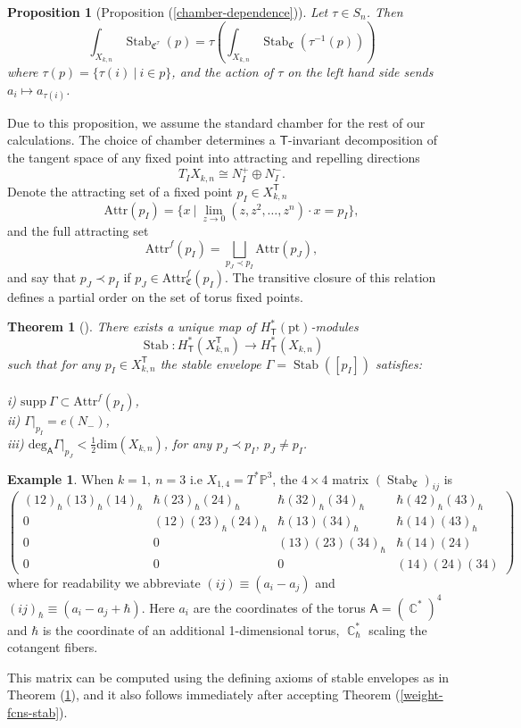 \documentclass[12 pt]{article}
\theoremstyle{plain}
\newtheorem{theorem}{Theorem}[section]
\theoremstyle{plain}
\theoremstyle{plain}
\theoremstyle{plain}
\theoremstyle{plain}
\theoremstyle{plain}
\theoremstyle{plain}
\theoremstyle{plain}
\newtheorem*{proposition*}{Proposition}
\theoremstyle{plain}
\theoremstyle{plain}
\theoremstyle{remark}
\theoremstyle{remark}
\theoremstyle{definition}
\theoremstyle{definition}
\theoremstyle{definition}
\newtheorem{example}{Example}[section]
\theoremstyle{definition}
\theoremstyle{definition}
\theoremstyle{definition}
\DeclareMathOperator{\C}{\mathbb{C}}
\DeclareMathOperator{\Stab}{Stab}
\DeclareMathOperator{\stab}{\text{Stab}}
\newcommand{\bT}{\mathsf{T}}
\newcommand{\bA}{\mathsf{A}}
\newcommand{\chamb}{\mathfrak{C}}
\begin{document}
\begin{proposition*}[Proposition (\ref{chamber-dependence})]
Let $\tau \in S_n$. Then 
\[
\int_{X_{k,n}}\Stab_{\chamb^{\tau}}(p) = \tau\left( \int_{X_{k,n}} \Stab_{\chamb}(\tau^{-1}(p)) \right)
\]
where $\tau(p) = \{\tau(i)\ |\ i \in p\}$, and the action of $\tau$ on the left hand side sends $a_i \mapsto a_{\tau(i)}$.
\end{proposition*}

Due to this proposition, we assume the standard chamber for the rest of our calculations. The choice of chamber determines a $\bT$-invariant decomposition of the tangent space of any fixed point into attracting and repelling directions
$$
T_I{X_{k,n}} \cong N_I^+ \oplus N_I^-.
$$
Denote the attracting set of a fixed point $p_I\in X_{k,n}^\bT$
$$
\text{Attr}(p_I)=\big\{x\ \big|\ \lim_{z\to 0}(z,z^2,\dots,z^n)\cdot x=p_I\big\},
$$
and the full attracting set
$$
\text{Attr}^f(p_I) = \bigsqcup_{p_J\prec p_I} \text{Attr}(p_J),
$$
and say that $p_J\prec p_I$ if $p_J \in \text{Attr}_{\chamb}^f(p_I)$. The transitive closure of this relation defines a partial order on the set of torus fixed points. 


\begin{theorem}[\cite{MO}]\label{stab-defn}
There exists a unique map of $H_\bT^*(\text{pt})$-modules
$$
\Stab: H_\bT^*(X_{k,n}^\bT)\to H_\bT^*(X_{k,n})
$$
such that for any $p_I \in X_{k,n}^\bT$ the stable envelope $\Gamma=\Stab([p_I])$ satisfies: \\\\
i) $\mathrm{supp}\ \Gamma\subset \mathrm{Attr}^f(p_I)$,\\
ii) $\Gamma|_{p_I}=e(N_-)$,\\
iii) $\mathrm{deg}_\bA\Gamma\big|_{p_J}<\frac12\mathrm{dim}(X_{k,n})$, \quad for any $p_J\prec p_I$, $p_J\ne p_I$. 
\end{theorem}

\begin{example}
When $k=1,\ n=3$ i.e $X_{1,4}=T^*\mathbb{P}^3$, the $4\times 4$ matrix $(\stab_\chamb)_{ij}$ is
\[\begin{pmatrix}
   (12)_\hbar(13)_\hbar(14)_\hbar & \hbar(23)_\hbar(24)_\hbar & \hbar(32)_\hbar(34)_\hbar& \hbar(42)_\hbar(43)_\hbar\\
   
   0 & (12)(23)_\hbar(24)_\hbar & \hbar(13)(34)_\hbar & \hbar(14)(43)_\hbar\\
   
   0 & 0 & (13)(23)(34)_\hbar & \hbar(14)(24)\\
   
   0 & 0 & 0 & (14)(24)(34)
\end{pmatrix}\]
where for readability we abbreviate $(ij)\equiv (a_i-a_j)$ and $(ij)_\hbar\equiv (a_i-a_j+\hbar)$. Here $a_i$ are the coordinates of the torus $\bA=(\C^*)^4$ and $\hbar$ is the coordinate of an additional 1-dimensional torus, $\C^{*}_{\hbar}$ scaling the cotangent fibers. 

This matrix can be computed using the defining axioms of stable envelopes as in Theorem (\ref{stab-defn}), and it also follows immediately after accepting Theorem (\ref{weight-fcns-stab}). 
\end{example}
\end{document}
